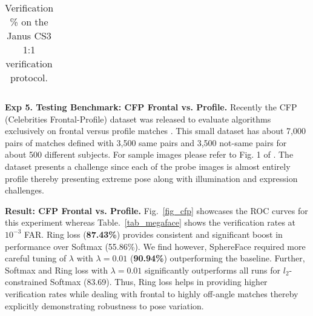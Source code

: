 \documentclass[10pt,twocolumn,letterpaper]{article}
\begin{document}
\begin{table}
\begin{tabular}{l c c c c}



\hline
\end{tabular}
\caption{Verification \% on the Janus CS3 1:1 verification protocol. }
\label{tab_cs3}
\end{table}



\textbf{Exp 5. Testing Benchmark: CFP Frontal vs. Profile. } Recently the CFP (Celebrities Frontal-Profile) dataset was released to evaluate algorithms exclusively on frontal versus profile matches \cite{sengupta2016frontal}. This small dataset has about 7,000 pairs of matches defined with 3,500 same pairs and 3,500 not-same pairs for about 500 different subjects. For sample images please refer to Fig. 1 of \cite{sengupta2016frontal}. The dataset presents a challenge since each of the probe images is almost entirely profile thereby presenting extreme pose along with illumination and expression challenges. 


\textbf{Result: CFP Frontal vs. Profile.} Fig.~\ref{fig_cfp} showcases the ROC curves for this experiment whereas Table.~\ref{tab_megaface} shows the verification rates at $10^{-3}$ FAR.  Ring loss (\textbf{87.43\%}) provides consistent and significant boost in performance over Softmax (55.86\%). We find however, SphereFace required more careful tuning of $\lambda$ with $\lambda=0.01$ (\textbf{90.94\%}) outperforming the baseline. Further, Softmax and Ring loss with $\lambda=0.01$ significantly outperforms all runs for $l_2$-constrained Softmax \cite{ranjan2017l2} (83.69). Thus, Ring loss helps in providing higher verification rates while dealing with frontal to highly off-angle matches thereby explicitly demonstrating robustness to pose variation.
\end{document}
